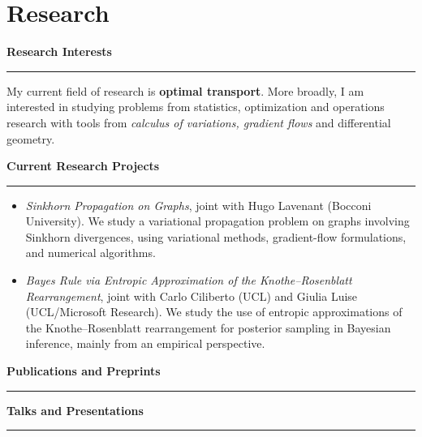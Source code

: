 \documentclass[11pt,a4paper,sans]{moderncv}
\newcommand{\cvsubsection}[1]{%
  \par
  \vspace{0.9em}%
  \noindent
  {\large\bfseries\color{cvaccent}#1}%
  \par
  \vspace{0.15em}%
  \noindent
  {\color{cvline}\rule{\textwidth}{0.4pt}}%
  \par
  \vspace{0.7em}%
}
\begin{document}
\newpage

\section{Research}

\cvsubsection{Research Interests}

My current field of research is \textbf{optimal transport}.
More broadly, I am interested in studying problems from statistics, optimization and operations research with tools from \emph{calculus of variations, gradient flows} and {differential geometry}.


\cvsubsection{Current Research Projects}

\begin{itemize}
    \item \emph{Sinkhorn Propagation on Graphs}, joint with Hugo Lavenant (Bocconi University). 
    We study a variational propagation problem on graphs involving Sinkhorn divergences, using variational methods, gradient-flow formulations, and numerical algorithms.

    \item \emph{Bayes Rule via Entropic Approximation of the Knothe--Rosenblatt Rearrangement}, joint with Carlo Ciliberto (UCL) and Giulia Luise (UCL/Microsoft Research). 
    We study the use of entropic approximations of the Knothe–Rosenblatt rearrangement for posterior sampling in Bayesian inference, mainly from an empirical perspective.
\end{itemize}

\cvsubsection{Publications and Preprints}


\cvsubsection{Talks and Presentations}
\end{document}
